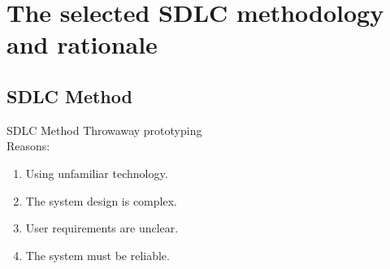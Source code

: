 \documentclass[aspectratio=169]{beamer}
\begin{document}
\section{The selected SDLC methodology and rationale}
\subsection{SDLC Method}
\begin{frame}{SDLC Method}
    Throwaway prototyping \\
    Reasons:
    \begin{enumerate}
        \item Using unfamiliar technology.
        \item The system design is complex.
        \item User requirements are unclear.
        \item The system must be reliable.
    \end{enumerate}


\end{frame}
\end{document}
